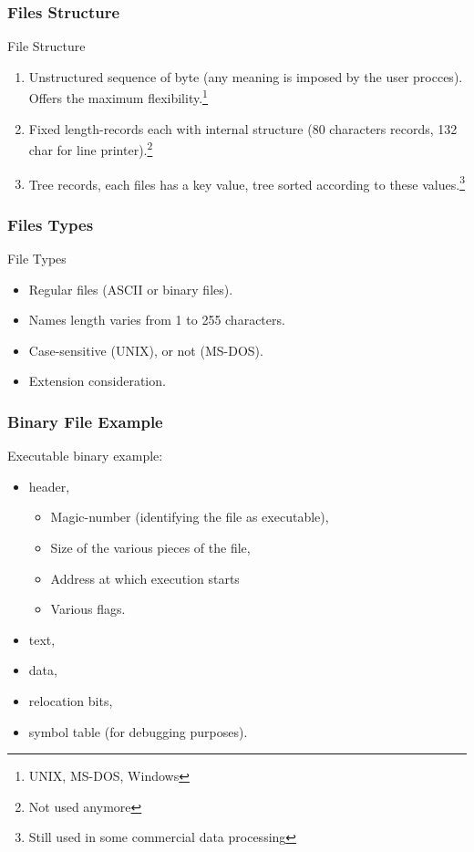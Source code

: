 \begin{frame}
  \frametitle{Files Structure}
  \begin{block}{File Structure}
    \begin{enumerate}
      \item Unstructured sequence of byte (any meaning is imposed by the user procces). Offers the maximum flexibility.\footnote{UNIX, MS-DOS, Windows}
      \item Fixed length-records each with internal structure (80 characters records, 132 char for line printer).\footnote{Not used anymore}
      \item Tree records, each files has a key value, tree sorted according to these values.\footnote{Still used in some commercial data processing}
    \end{enumerate}
  \end{block}
\end{frame}

\begin{frame}
  \frametitle{Files Types}
  \begin{block}{File Types}
    \begin{itemize}
      \item Regular files (ASCII or binary files).
      \item Names length varies from 1 to 255 characters.
      \item Case-sensitive (UNIX), or not (MS-DOS).
      \item Extension consideration.
    \end{itemize}
  \end{block}
\end{frame}

\begin{frame}
  \frametitle{Binary File Example}
  \begin{block}{Executable binary example:}
    \begin{itemize}
      \item header,
      \begin{itemize}
          \item Magic-number (identifying the file as executable),
          \item Size of the various pieces of the file,
          \item Address at which execution starts
          \item Various flags.
      \end{itemize}
      \item text,
      \item data,
      \item relocation bits,
      \item symbol table (for debugging purposes).
    \end{itemize}
  \end{block}
\end{frame}

